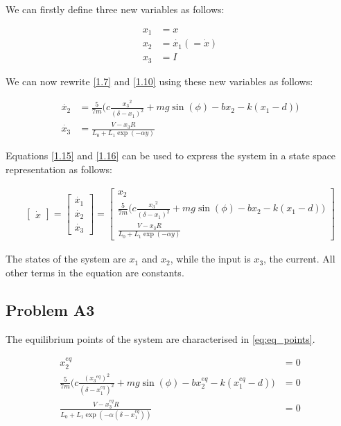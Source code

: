 \documentclass[a4paper,10pt,reqno]{amsart}
\numberwithin{equation}{section}
\begin{document}
We can firstly define three new variables as follows:

\begin{align}
x_1 &= x \label{1.12} \\
x_2 &= \dot{x_1} (= \dot{x}) \label{1.13} \\
x_3 &= I \label{1.14}
\end{align}

\newline We can now rewrite \ref{1.7} and \ref{1.10} using these new variables as follows:

\begin{align}
\dot{x_2} &= \frac{5}{7m}\bigg(c \frac{{x_3}^2}{(\delta - x_1)^2} + mg\sin(\phi) - bx_2 - k(x_1-d)\bigg) \label{1.15} \\
\dot{x_3} &= \frac{V - x_3 R}{L_0 + L_1\exp(-\alpha y)} \label{1.16}
\end{align}

Equations \ref{1.15} and \ref{1.16} can be used to express the system in a state space representation as follows:

\begin{align}
\begin{bmatrix}
\dot{x}
\end{bmatrix}
=
\begin{bmatrix}
\dot{x_1}\\
\dot{x_2}\\
\dot{x_3}
\end{bmatrix}
=
\begin{bmatrix}
x_2 \\
\frac{5}{7m}\bigg(c \frac{{x_3}^2}{(\delta - x_1)^2} + mg\sin(\phi) - bx_2 - k(x_1-d)\bigg)\\
\frac{V - x_3 R}{L_0 + L_1\exp(-\alpha y)}
\end{bmatrix}
\label{1.17}
\end{align}

The states of the system are $x_1$ and $x_2$, while the input is $x_3$, the current. All other terms in the equation are constants.



\subsection{Problem A3}\label{sec:a3}
The equilibrium points of the system are characterised in \eqref{eq:eq_points}.

\begin{subequations}\label{eq:eq_points}
\begin{align}
      x^{eq}_{2} &= 0 \label{1.18a} \\
     \frac{5}{7m}\bigg(c \frac{({x_3}^{eq})^2}{(\delta - x_1^{eq})^2} + mg\sin(\phi) - bx_2^{eq} - k(x_1^{eq}-d)\bigg) &= 0 \label{1.18b} \\
     \frac{V - x_3^{eq}R}{L_0 + L_1\exp(-\alpha(\delta - x_1^{eq}))} &= 0 \label{1.18c}
\end{align}
\end{subequations}
\end{document}
